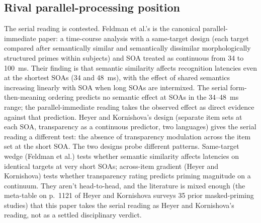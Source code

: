 \subsection{Rival parallel-processing position}

The serial reading is contested. Feldman et al.'s \autocite*{feldman-etal-2015-must-analysis}  is the canonical parallel-immediate paper: a time-course analysis with a same-target design (each target compared after semantically similar and semantically dissimilar morphologically structured primes within subjects) and SOA treated as continuous from 34 to 100~ms. Their finding is that semantic similarity affects recognition latencies even at the shortest SOAs (34 and 48~ms), with the effect of shared semantics increasing linearly with SOA when long SOAs are intermixed. The serial form-then-meaning ordering predicts no semantic effect at SOAs in the 34--48~ms range; the parallel-immediate reading takes the observed effect as direct evidence against that prediction. Heyer and Kornishova's design (separate item sets at each SOA, transparency as a continuous predictor, two languages) gives the serial reading a different test: the absence of transparency modulation across the item set at the short SOA. The two designs probe different patterns. Same-target wedge (Feldman et al.) tests whether semantic similarity affects latencies on identical targets at very short SOAs; across-item gradient (Heyer and Kornishova) tests whether transparency rating predicts priming magnitude on a continuum. They aren't head-to-head, and the literature is mixed enough (the meta-table on p.~1121 of Heyer and Kornishova surveys 35 prior masked-priming studies) that this paper takes the serial reading as Heyer and Kornishova's reading, not as a settled disciplinary verdict.
